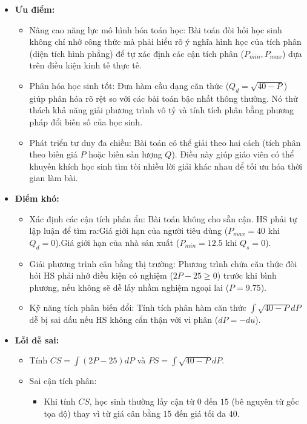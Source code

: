 \documentclass[12pt,a4paper,oneside]{book}
\theoremstyle{theorem}
\theoremstyle{definition}
\begin{document}
\begin{itemize}
    \item \textbf{Ưu điểm:} 
    \begin{itemize}
    \item Nâng cao năng lực mô hình hóa toán học: Bài toán đòi hỏi học sinh không chỉ nhớ công thức mà phải hiểu rõ ý nghĩa hình học của tích phân (diện tích hình phẳng) để tự xác định các cận tích phân ($P_{min}, P_{max}$) dựa trên điều kiện kinh tế thực tế.
    \item Phân hóa học sinh tốt: Đưa hàm cầu dạng căn thức ($Q_d = \sqrt{40-P}$) giúp phân hóa rõ rệt so với các bài toán bậc nhất thông thường. Nó thử thách khả năng giải phương trình vô tỷ và tính tích phân bằng phương pháp đổi biến số của học sinh.
    \item Phát triển tư duy đa chiều: Bài toán có thể giải theo hai cách (tích phân theo biến giá $P$ hoặc biến sản lượng $Q$). Điều này giúp giáo viên có thể khuyến khích học sinh tìm tòi nhiều lời giải khác nhau để tối ưu hóa thời gian làm bài.
    \end{itemize}
    \item \textbf{Điểm khó:}
    \begin{itemize}
        \item Xác định các cận tích phân ẩn: Bài toán không cho sẵn cận. HS phải tự lập luận để tìm ra:Giá giới hạn của người tiêu dùng ($P_{max} = 40$ khi $Q_d = 0$).Giá giới hạn của nhà sản xuất ($P_{min} = 12.5$ khi $Q_s = 0$).
        \item Giải phương trình cân bằng thị trường: Phương trình chứa căn thức đòi hỏi HS phải nhớ điều kiện có nghiệm ($2P - 25 \ge 0$) trước khi bình phương, nếu không sẽ dễ lấy nhầm nghiệm ngoại lai ($P = 9.75$).
        \item Kỹ năng tích phân biến đổi: Tính tích phân hàm căn thức $\int \sqrt{40-P} dP$ dễ bị sai dấu nếu HS không cẩn thận với vi phân ($dP = -du$).
    \end{itemize}
    \item \textbf{Lỗi dễ sai:}
    \begin{itemize}
        \item Tính $CS = \int (2P - 25) dP$ và $PS = \int \sqrt{40-P} dP$.
        \item Sai cận tích phân:
        \begin{itemize}
            \item Khi tính $CS$, học sinh thường lấy cận từ $0$ đến $15$ (bê nguyên từ gốc tọa độ) thay vì từ giá cân bằng $15$ đến giá tối đa $40$.

\end{itemize}
\end{itemize}
\end{itemize}
\end{document}
